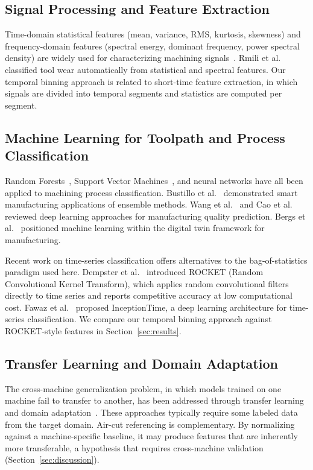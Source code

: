 \subsection{Signal Processing and Feature Extraction}

Time-domain statistical features (mean, variance, RMS, kurtosis, skewness) and frequency-domain features (spectral energy, dominant frequency, power spectral density) are widely used for characterizing machining signals~\cite{dimla2000sensor, kuo2000spectral, albadour2011wavelet}. Rmili et al.~\cite{rmili2016automatic} classified tool wear automatically from statistical and spectral features. Our temporal binning approach is related to short-time feature extraction, in which signals are divided into temporal segments and statistics are computed per segment.

\subsection{Machine Learning for Toolpath and Process Classification}

Random Forests~\cite{breiman2001randomforests}, Support Vector Machines~\cite{widodo2007svm, sun2004svm}, and neural networks have all been applied to machining process classification. Bustillo et al.~\cite{bustillo2022smart} demonstrated smart manufacturing applications of ensemble methods. Wang et al.~\cite{wang2018deep} and Cao et al.~\cite{cao2024deep} reviewed deep learning approaches for manufacturing quality prediction. Bergs et al.~\cite{bergs2020digital} positioned machine learning within the digital twin framework for manufacturing.

Recent work on time-series classification offers alternatives to the bag-of-statistics paradigm used here. Dempster et al.~\cite{dempster2020rocket} introduced ROCKET (Random Convolutional Kernel Transform), which applies random convolutional filters directly to time series and reports competitive accuracy at low computational cost. Fawaz et al.~\cite{fawaz2020inceptiontime} proposed InceptionTime, a deep learning architecture for time-series classification. We compare our temporal binning approach against ROCKET-style features in Section~\ref{sec:results}.

\subsection{Transfer Learning and Domain Adaptation}

The cross-machine generalization problem, in which models trained on one machine fail to transfer to another, has been addressed through transfer learning~\cite{pan2010transfer, li2020transfer} and domain adaptation~\cite{jiao2020domain}. These approaches typically require some labeled data from the target domain. Air-cut referencing is complementary. By normalizing against a machine-specific baseline, it may produce features that are inherently more transferable, a hypothesis that requires cross-machine validation (Section~\ref{sec:discussion}).

